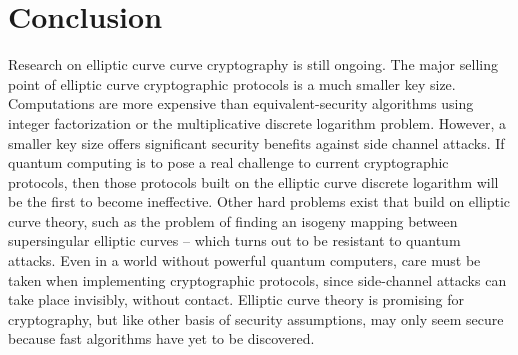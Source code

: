 \documentclass{article}
\begin{document}
\section{Conclusion}
Research on elliptic curve curve cryptography is still ongoing. The major
selling point of elliptic curve cryptographic protocols is a much smaller key
size. Computations are more expensive than equivalent-security algorithms using
integer factorization or the multiplicative discrete logarithm problem.
However, a smaller key size offers significant security benefits against side
channel attacks. If quantum computing is to pose a real challenge to current
cryptographic protocols, then those protocols built on the elliptic curve
discrete logarithm will be the first to become ineffective. Other hard problems
exist that build on elliptic curve theory, such as the problem of finding an
isogeny mapping between supersingular elliptic curves -- which turns out to be
resistant to quantum attacks. Even in a world without powerful quantum
computers, care must be taken when implementing cryptographic protocols, since
side-channel attacks can take place invisibly, without contact. Elliptic curve
theory is promising for cryptography, but like other basis of security
assumptions, may only seem secure because fast algorithms have yet to be
discovered.

\printbibliography
\end{document}
